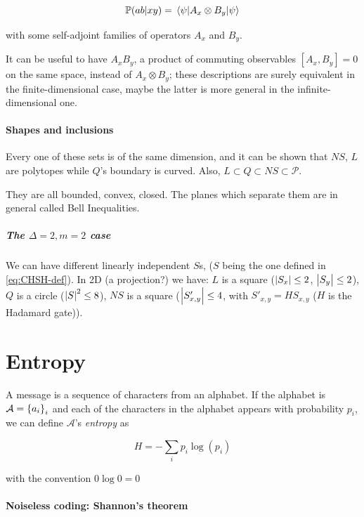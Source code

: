 \documentclass[main.tex]{subfiles}
\begin{document}
\begin{equation}
    \P (ab|xy) = \ev{A_x \otimes B_y}{\psi}
\end{equation}

with some self-adjoint families of operators \(A_x\) and \(B_y\).

It can be useful to have \(A_x B_y\), a product of commuting observables \([A_x, B_y]=0\) on the same space, instead of \(A_x \otimes B_y\); these descriptions are surely equivalent in the finite-dimensional case, maybe the latter is more general in the infinite-dimensional one.

\paragraph{Shapes and inclusions}

Every one of these sets is of the same dimension, and it can be shown that \(NS\), \(L\) are polytopes while \(Q\)'s boundary is curved. Also, \(L \subset Q \subset NS \subset \mathcal P\).

They are all bounded, convex, closed. The planes which separate them are in general called Bell Inequalities.

\subparagraph{The $\Delta=2, m=2$ case}

We can have different linearly independent \(S\)s, (\(S\) being the one defined in \eqref{eq:CHSH-def}). In 2D (a projection?) we have: \(L\) is a square (\(\abs{S_x} \leq 2\), \(\abs{S_y} \leq 2\)), \(Q\) is a circle (\(\abs{S}^2 \leq 8 \)), \(NS\) is a square (\(\abs{S'_{x, y}} \leq 4 \), with \(S'_{x, y} = H S_{x, y}\) ($H$ is the Hadamard gate)).

\section{Entropy}

A message is a sequence of characters from an alphabet. If the alphabet is \(\mathcal A = \qty{a_i}_i\) and each of the characters in the alphabet appears with probability \(p_i\), we can define \(\mathcal A\)'s \emph{entropy} as

\begin{equation}
    H = - \sum _{i} p_i \log(p_i)
\end{equation}

with the convention \(0 \log 0 = 0\)

\paragraph{Noiseless coding: Shannon's theorem}
\end{document}
